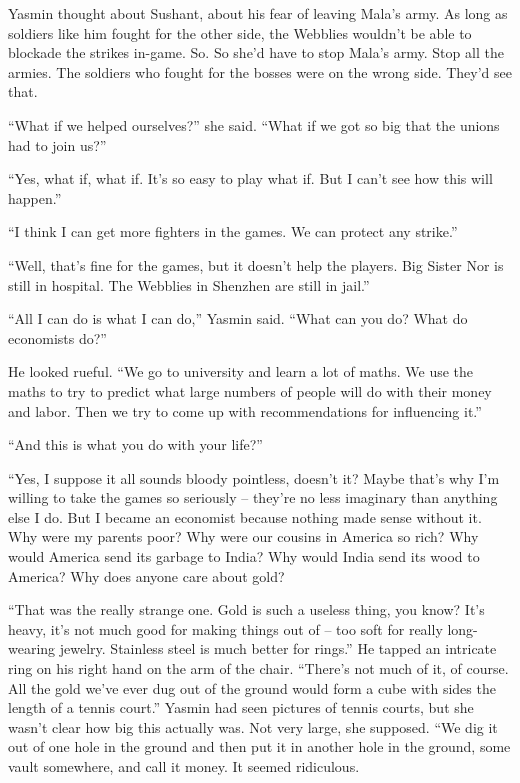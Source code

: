 Yasmin thought about Sushant, about his fear of leaving Mala's
army. As long as soldiers like him fought for the other side, the
Webblies wouldn't be able to blockade the strikes in-game. So. So
she'd have to stop Mala's army. Stop all the armies. The soldiers
who fought for the bosses were on the wrong side. They'd see that.

``What if we helped ourselves?'' she said. ``What if we got so big
that the unions had to join us?''

``Yes, what if, what if. It's so easy to play what if. But I can't
see how this will happen.''

``I think I can get more fighters in the games. We can protect any
strike.''

``Well, that's fine for the games, but it doesn't help the players.
Big Sister Nor is still in hospital. The Webblies in Shenzhen are
still in jail.''

``All I can do is what I can do,'' Yasmin said. ``What can you do?
What do economists do?''

He looked rueful. ``We go to university and learn a lot of maths. We
use the maths to try to predict what large numbers of people will
do with their money and labor. Then we try to come up with
recommendations for influencing it.''

``And this is what you do with your life?''

``Yes, I suppose it all sounds bloody pointless, doesn't it? Maybe
that's why I'm willing to take the games so seriously -- they're no
less imaginary than anything else I do. But I became an economist
because nothing made sense without it. Why were my parents poor?
Why were our cousins in America so rich? Why would America send its
garbage to India? Why would India send its wood to America? Why
does anyone care about gold?

``That was the really strange one. Gold is such a useless thing, you
know? It's heavy, it's not much good for making things out of --
too soft for really long-wearing jewelry. Stainless steel is much
better for rings.'' He tapped an intricate ring on his right hand on
the arm of the chair. ``There's not much of it, of course. All the
gold we've ever dug out of the ground would form a cube with sides
the length of a tennis court.'' Yasmin had seen pictures of tennis
courts, but she wasn't clear how big this actually was. Not very
large, she supposed. ``We dig it out of one hole in the ground and
then put it in another hole in the ground, some vault somewhere,
and call it money. It seemed ridiculous.

